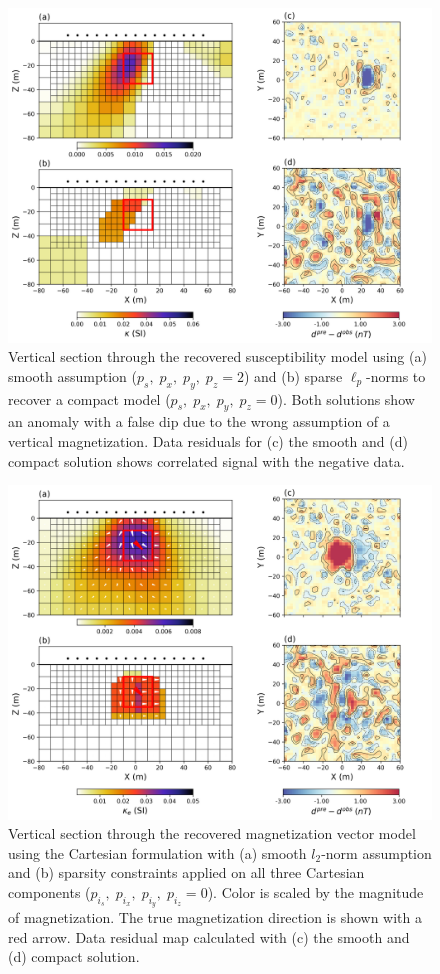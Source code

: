 \documentclass[paper]{geophysics}
\begin{document}
\begin{figure}[p!]
\includegraphics[width=\columnwidth]{Figures/Figure2.png}
\caption{Vertical section through the recovered susceptibility model using (a) smooth assumption ($p_s, \;p_x,\; p_y,\; p_z = 2$) and (b) sparse $\ell_p$-norms to recover a compact model ($p_s,\;p_x,\; p_y,\; p_z = 0$). Both solutions show an anomaly with a false dip due to the wrong assumption of a vertical magnetization. Data residuals for (c) the smooth and (d) compact solution shows correlated signal with the negative data.}\label{Susc_model}
\end{figure}

\begin{figure}[p!]
\includegraphics[width=\columnwidth]{Figures/Figure3.png}
\caption{Vertical section through the recovered magnetization vector model using the Cartesian formulation with (a) smooth $l_2$-norm assumption and (b) sparsity constraints applied on all three Cartesian components ($p_{i_s}, \;p_{i_x},\; p_{i_y},\; p_{i_z} = 0$). Color is scaled by the magnitude of magnetization. The true magnetization direction is shown with a red arrow. Data residual map calculated with (c) the smooth and (d) compact solution.}
\label{MVI_C_model}
\end{figure}
\end{document}
